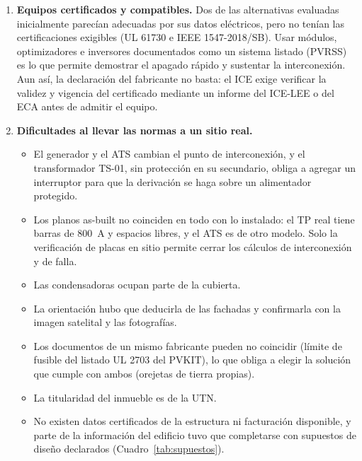 \documentclass[12pt]{article}
\begin{document}
\begin{enumerate}
\begin{itemize}
\item NFPA 1 §11.12, adoptada por el RNPCI, definió la huella del arreglo.
\item Los lineamientos de viento del CFIA (Zona~III, $V_b=115$~km/h, objetivos de desempeño por categoría) definieron la ubicación en la zona interior y las cargas exigidas a la sujeción.
\item La Ley 10086 y ARESEP determinaron la modalidad y el trámite.
\end{itemize}
\item \textbf{Equipos certificados y compatibles.} Dos de las alternativas evaluadas inicialmente parecían adecuadas por sus datos eléctricos, pero no tenían las certificaciones exigibles (UL 61730 e IEEE 1547-2018/SB). Usar módulos, optimizadores e inversores documentados como un sistema listado (PVRSS) es lo que permite demostrar el apagado rápido y sustentar la interconexión. Aun así, la declaración del fabricante no basta: el ICE exige verificar la validez y vigencia del certificado mediante un informe del ICE-LEE o del ECA antes de admitir el equipo.
\item \textbf{Dificultades al llevar las normas a un sitio real.}
\begin{itemize}
\item El generador y el ATS cambian el punto de interconexión, y el transformador TS-01, sin protección en su secundario, obliga a agregar un interruptor para que la derivación se haga sobre un alimentador protegido.
\item Los planos as-built no coinciden en todo con lo instalado: el TP real tiene barras de 800~A y espacios libres, y el ATS es de otro modelo. Solo la verificación de placas en sitio permite cerrar los cálculos de interconexión y de falla.
\item Las condensadoras ocupan parte de la cubierta.
\item La orientación hubo que deducirla de las fachadas y confirmarla con la imagen satelital y las fotografías.
\item Los documentos de un mismo fabricante pueden no coincidir (límite de fusible del listado UL 2703 del PVKIT), lo que obliga a elegir la solución que cumple con ambos (orejetas de tierra propias).
\item La titularidad del inmueble es de la UTN.
\item No existen datos certificados de la estructura ni facturación disponible, y parte de la información del edificio tuvo que completarse con supuestos de diseño declarados (Cuadro~\ref{tab:supuestos}).

\end{itemize}
\end{enumerate}
\end{document}
